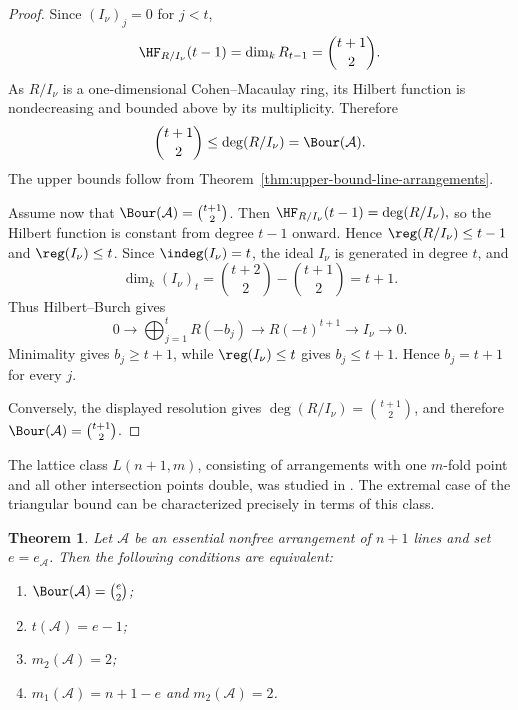 \documentclass[11pt]{amsart}   %
\newtheorem{Theorem}{Theorem}[section]
\theoremstyle{definition}
\def\A{{\mathcal A}}
\begin{document}
\begin{proof}
Since $(I_\nu)_j=0$ for $j<t$,
\[
\HF_{R/I_\nu}(t-1)
=\dim_kR_{t-1}
=\binom{t+1}{2}.
\]
As $R/I_\nu$ is a one-dimensional Cohen--Macaulay ring, its Hilbert function is nondecreasing and bounded above by its multiplicity. Therefore
\[
\binom{t+1}{2}
\leq\deg(R/I_\nu)
=\Bour(\A).
\]
The upper bounds follow from Theorem~\ref{thm:upper-bound-line-arrangements}.

Assume now that $\Bour(\A)=\binom{t+1}{2}$. Then $\HF_{R/I_\nu}(t-1)=\deg(R/I_\nu),$ so the Hilbert function is constant from degree $t-1$ onward. Hence $\reg(R/I_\nu)\leq t-1$ and $\reg(I_\nu)\leq t$. Since $\indeg(I_\nu)=t$, the ideal $I_\nu$ is generated in degree $t$, and
\[
\dim_k(I_\nu)_t
=\binom{t+2}{2}-\binom{t+1}{2}
=t+1.
\]
Thus Hilbert--Burch gives
\[
0\longrightarrow
\bigoplus_{j=1}^{t}R(-b_j) \longrightarrow R(-t)^{t+1} \longrightarrow I_\nu\longrightarrow0.
\]
Minimality gives $b_j\geq t+1$, while $\reg(I_\nu)\leq t$ gives $b_j\leq t+1$. Hence $b_j=t+1$ for every $j$.

Conversely, the displayed resolution gives $\deg(R/I_\nu)=\binom{t+1}{2}$, and therefore $\Bour(\A)=\binom{t+1}{2}$.
\end{proof}

The lattice class $L(n+1,m)$, consisting of arrangements with one $m$-fold point and all other intersection points double, was studied in \cite[Proposition~4.7]{Dimca-Ibadula-Macinic}. The extremal case of the triangular bound can be characterized precisely in terms of this class.

\begin{Theorem}
\label{thm:extremal-triangular-arrangements}
Let $\A$ be an essential nonfree arrangement of $n+1$ lines and set $e=e_\A$. Then the following conditions are equivalent:
\begin{enumerate}
\item[{\rm (a)}] $\Bour(\A)=\binom e2$;
\item[{\rm (b)}] $t(\A)=e-1$;
\item[{\rm (c)}] $m_2(\A)=2$;
\item[{\rm (d)}] $m_1(\A)=n+1-e$ and $m_2(\A)=2$.
\end{enumerate}
\end{Theorem}
\end{document}
